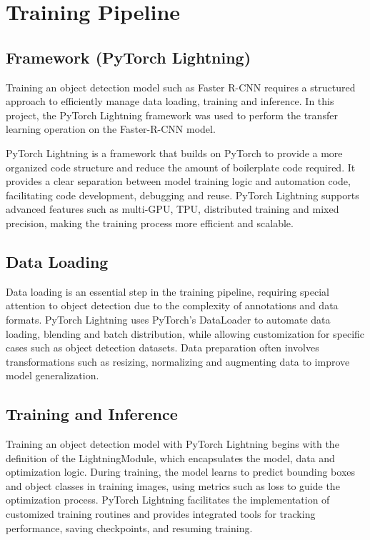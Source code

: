 \documentclass[12pt,oneside]{book} %
\begin{document}
\newpage
\section{Training Pipeline}

\subsection{Framework (PyTorch Lightning)}
Training an object detection model such as Faster R-CNN requires a structured
approach to efficiently manage data loading, training and inference. In this
project, the PyTorch Lightning framework was used to perform the transfer
learning operation on the Faster-R-CNN model.

PyTorch Lightning is a framework that builds on PyTorch to provide a more
organized code structure and reduce the amount of boilerplate code required. It
provides a clear separation between model training logic and automation code,
facilitating code development, debugging and reuse. PyTorch Lightning supports
advanced features such as multi-GPU, TPU, distributed training and mixed
precision, making the training process more efficient and scalable.

\subsection{Data Loading}
Data loading is an essential step in the training pipeline, requiring special
attention to object detection due to the complexity of annotations and data
formats. PyTorch Lightning uses PyTorch's DataLoader to automate data loading,
blending and batch distribution, while allowing customization for specific
cases such as object detection datasets. Data preparation often involves
transformations such as resizing, normalizing and augmenting data to improve
model generalization.

\subsection{Training and Inference}

Training an object detection model with PyTorch Lightning begins with the
definition of the LightningModule, which encapsulates the model, data and
optimization logic. During training, the model learns to predict bounding boxes
and object classes in training images, using metrics such as loss to guide the
optimization process. PyTorch Lightning facilitates the implementation of
customized training routines and provides integrated tools for tracking
performance, saving checkpoints, and resuming training.
\end{document}
